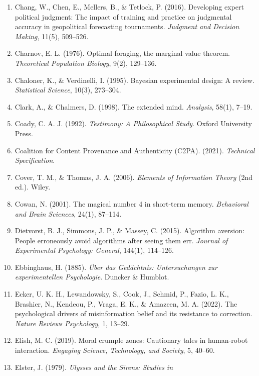 \documentclass[
  11pt]{article}
\begin{document}
\begin{enumerate}
  (2017). Debunking: A meta-analysis of the psychological efficacy of
  messages countering misinformation. \emph{Psychological Science},
  28(11), 1544--1550.
\item
  Chang, W., Chen, E., Mellers, B., \& Tetlock, P. (2016). Developing
  expert political judgment: The impact of training and practice on
  judgmental accuracy in geopolitical forecasting tournaments.
  \emph{Judgment and Decision Making}, 11(5), 509--526.
\item
  Charnov, E. L. (1976). Optimal foraging, the marginal value theorem.
  \emph{Theoretical Population Biology}, 9(2), 129--136.
\item
  Chaloner, K., \& Verdinelli, I. (1995). Bayesian experimental design:
  A review. \emph{Statistical Science}, 10(3), 273--304.
\item
  Clark, A., \& Chalmers, D. (1998). The extended mind. \emph{Analysis},
  58(1), 7--19.
\item
  Coady, C. A. J. (1992). \emph{Testimony: A Philosophical Study}.
  Oxford University Press.
\item
  Coalition for Content Provenance and Authenticity (C2PA). (2021).
  \emph{Technical Specification}.
\item
  Cover, T. M., \& Thomas, J. A. (2006). \emph{Elements of Information
  Theory} (2nd ed.). Wiley.
\item
  Cowan, N. (2001). The magical number 4 in short-term memory.
  \emph{Behavioral and Brain Sciences}, 24(1), 87--114.
\item
  Dietvorst, B. J., Simmons, J. P., \& Massey, C. (2015). Algorithm
  aversion: People erroneously avoid algorithms after seeing them err.
  \emph{Journal of Experimental Psychology: General}, 144(1), 114--126.
\item
  Ebbinghaus, H. (1885). \emph{Über das Gedächtnis: Untersuchungen zur
  experimentellen Psychologie}. Duncker \& Humblot.
\item
  Ecker, U. K. H., Lewandowsky, S., Cook, J., Schmid, P., Fazio, L. K.,
  Brashier, N., Kendeou, P., Vraga, E. K., \& Amazeen, M. A. (2022). The
  psychological drivers of misinformation belief and its resistance to
  correction. \emph{Nature Reviews Psychology}, 1, 13--29.
\item
  Elish, M. C. (2019). Moral crumple zones: Cautionary tales in
  human-robot interaction. \emph{Engaging Science, Technology, and
  Society}, 5, 40--60.
\item
  Elster, J. (1979). \emph{Ulysses and the Sirens: Studies in
}
\end{enumerate}
\end{document}
